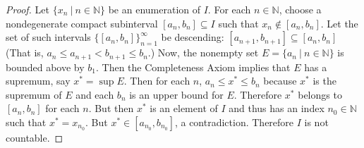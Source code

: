 \documentclass[a4paper,10pt]{book}
\theoremstyle{plain} %
\begin{document}
\begin{flushleft}
\begin{proof}
Let $\{x_n \ |\ n \in \mathbb{N} \}$ be an enumeration of $I$. 
For each $n \in \mathbb{N}$, choose a nondegenerate compact subinterval $[a_n,b_n] \subseteq I$ such that $x_n \notin [a_n,b_n]$. 
Let the set of such intervals $\{[a_n,b_n]\}_{n=1}^\infty$ be descending: $[a_{n+1},b_{n+1}] \subseteq [a_n,b_n]$ (That is, $a_n \le a_{n+1}<b_{n+1}\le b_n$.)
Now, the nonempty set $E = \{a_n \ |\ n \in \mathbb{N} \}$ is bounded above by $b_1$.
Then the Completeness Axiom implies that $E$ has a supremum, say $x^* = \sup E$. 
Then for each $n$, $a_n \le x^* \le b_n$ because $x^*$ is the supremum of $E$ and each $b_n$ is an upper bound for $E$.
Therefore $x^*$ belongs to $[a_n,b_n]$ for each $n$.
But then $x^*$ is an element of $I$ and thus has an index $n_0 \in \mathbb{N}$ such that $x^* = x_{n_0}$. But $x^* \in [a_{n_0},b_{n_0}]$, a contradiction.
Therefore $I$ is not countable.
\end{proof}

\end{flushleft}
\end{document}
